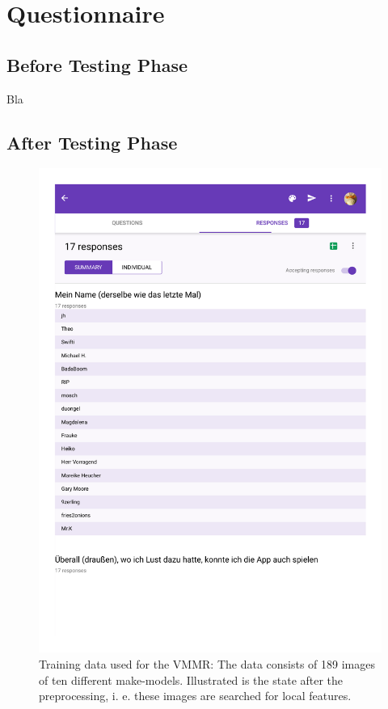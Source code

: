 \chapter{Questionnaire}
\section{Before Testing Phase}
Bla

\section{After Testing Phase}
\begin{figure}[btph]
  \centering
        \includegraphics[page=3,width=.7\linewidth]{gfx/Evaluation_post}
        \caption{Training data used for the VMMR: The data consists of 189 images of ten different make-models. Illustrated is the state after the preprocessing, i. e. these images are searched for local features.}
        \label{fig:evaluationPost}
\end{figure}




